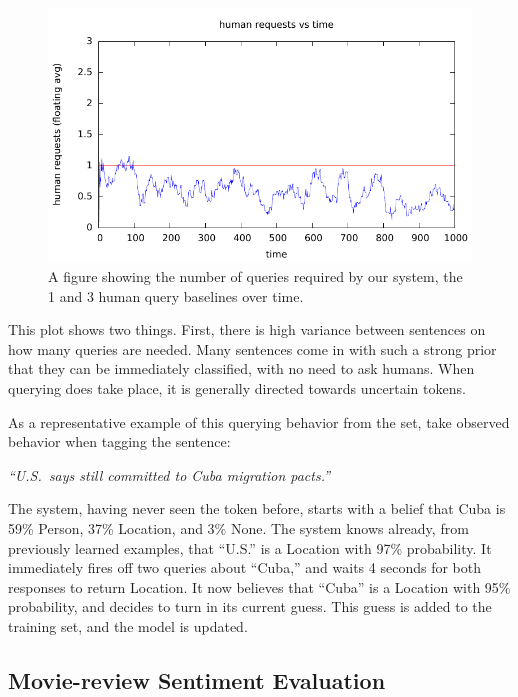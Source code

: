 \begin{figure}[t]
  \begin{centering}
  \includegraphics[width=1.0\textwidth]{figures/ner_2_class/cost_plot/cost_vs_time.pdf}
  \end{centering}
  \caption{A figure showing the number of queries required by our system, the 1 and 3 human query baselines over time.}
\label{fig:crf}
\end{figure}

This plot shows two things. First, there is high variance between sentences on how many queries are needed.
Many sentences come in with such a strong prior that they can be immediately classified, with no need to ask humans.
When querying does take place, it is generally directed towards uncertain tokens.

As a representative example of this querying behavior from the set, take observed behavior when tagging the sentence:

\begin{center}
\textit{``U.S.\ says still committed to Cuba migration pacts.''}
\end{center}

The system, having never seen the token before, starts with a belief that Cuba is 59\% Person, 37\% Location, and 3\% None. The system knows already, from previously learned examples, that ``U.S.'' is a Location with 97\% probability. It immediately fires off two queries about ``Cuba,'' and waits 4 seconds for both responses to return Location. It now believes that ``Cuba'' is a Location with 95\% probability, and decides to turn in its current guess. This guess is added to the training set, and the model is updated.

\subsection{Movie-review Sentiment Evaluation}


